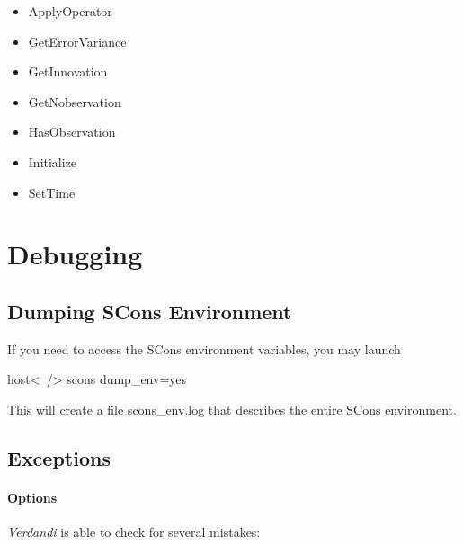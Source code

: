 \documentclass{tufte-book}
\begin{document}
\begin{itemize}
\item ApplyOperator
\item GetErrorVariance
\item GetInnovation
\item GetNobservation
\item HasObservation
\item Initialize
\item SetTime
\end{itemize}

\hypertarget{debugging}{}\section{Debugging}\label{debugging}

\hypertarget{debugging_dumping_scons_environment}{}\subsection{\-Dumping S\-Cons Environment}\label{debugging_dumping_scons_environment}
\-If you need to access the \-S\-Cons environment variables, you may launch

\begin{frame_bash}
host<~/> scons dump_env=yes
\end{frame_bash}


\-This will create a file {\ttfamily scons\-\_\-env.\-log} that describes the entire \-S\-Cons environment.

\hypertarget{debugging_exceptions}{}\subsection{\-Exceptions}\label{debugging_exceptions}


\hypertarget{debugging_exceptions_options}{}\paragraph{\-Options}\label{debugging_exceptions_options}

\-\emph{Verdandi} is able to check for several mistakes\-:
\end{document}
